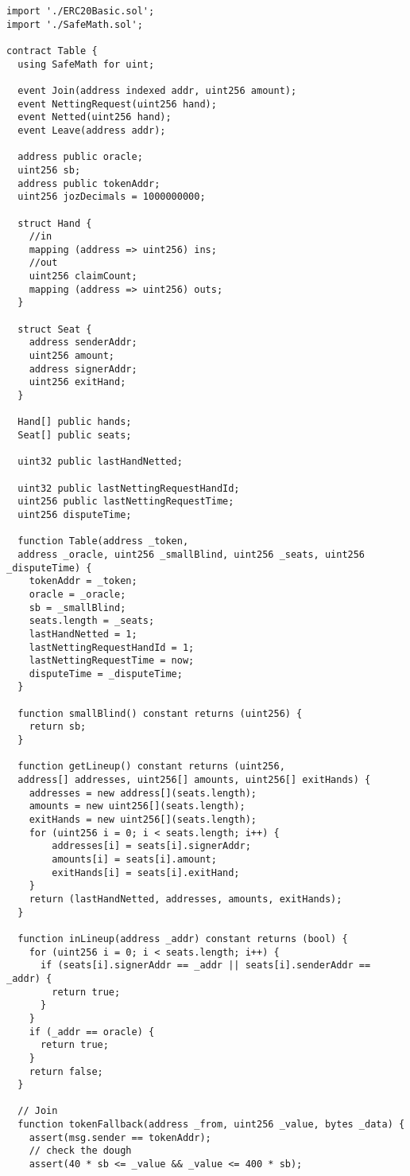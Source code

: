 \documentclass[conference]{IEEEtran}
\begin{document}
\begin{verbatim}
import './ERC20Basic.sol';
import './SafeMath.sol';

contract Table {
  using SafeMath for uint;

  event Join(address indexed addr, uint256 amount);
  event NettingRequest(uint256 hand);
  event Netted(uint256 hand);
  event Leave(address addr);

  address public oracle;
  uint256 sb;
  address public tokenAddr;
  uint256 jozDecimals = 1000000000;
  
  struct Hand {
    //in
    mapping (address => uint256) ins;
    //out
    uint256 claimCount;
    mapping (address => uint256) outs;
  }

  struct Seat {
    address senderAddr;
    uint256 amount;
    address signerAddr;
    uint256 exitHand;
  }
  
  Hand[] public hands;
  Seat[] public seats;

  uint32 public lastHandNetted;
  
  uint32 public lastNettingRequestHandId;
  uint256 public lastNettingRequestTime;
  uint256 disputeTime;
  
  function Table(address _token,
  address _oracle, uint256 _smallBlind, uint256 _seats, uint256 _disputeTime) {
    tokenAddr = _token;
    oracle = _oracle;
    sb = _smallBlind;
    seats.length = _seats;
    lastHandNetted = 1;
    lastNettingRequestHandId = 1;
    lastNettingRequestTime = now;
    disputeTime = _disputeTime;
  }

  function smallBlind() constant returns (uint256) {
    return sb;
  }
  
  function getLineup() constant returns (uint256, 
  address[] addresses, uint256[] amounts, uint256[] exitHands) {
    addresses = new address[](seats.length);
    amounts = new uint256[](seats.length);
    exitHands = new uint256[](seats.length);
    for (uint256 i = 0; i < seats.length; i++) {
        addresses[i] = seats[i].signerAddr;
        amounts[i] = seats[i].amount;
        exitHands[i] = seats[i].exitHand;
    }
    return (lastHandNetted, addresses, amounts, exitHands);
  }

  function inLineup(address _addr) constant returns (bool) {
    for (uint256 i = 0; i < seats.length; i++) {
      if (seats[i].signerAddr == _addr || seats[i].senderAddr == _addr) {
        return true;
      }
    }
    if (_addr == oracle) {
      return true;
    }
    return false;
  }
  
  // Join
  function tokenFallback(address _from, uint256 _value, bytes _data) {
    assert(msg.sender == tokenAddr);
    // check the dough
    assert(40 * sb <= _value && _value <= 400 * sb);


\end{verbatim}
\end{document}
